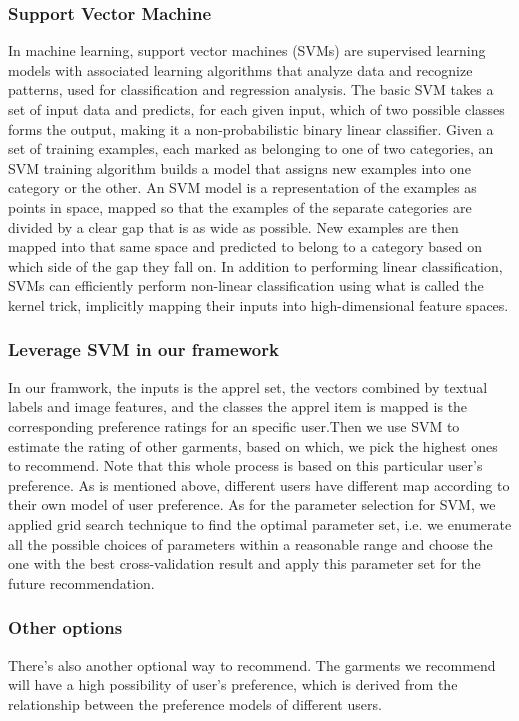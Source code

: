 \subsubsection{Support Vector Machine}
In machine learning, support vector machines (SVMs) are supervised learning models with associated learning algorithms that analyze data and recognize patterns, used for classification and regression analysis. The basic SVM takes a set of input data and predicts, for each given input, which of two possible classes forms the output, making it a non-probabilistic binary linear classifier. Given a set of training examples, each marked as belonging to one of two categories, an SVM training algorithm builds a model that assigns new examples into one category or the other. An SVM model is a representation of the examples as points in space, mapped so that the examples of the separate categories are divided by a clear gap that is as wide as possible. New examples are then mapped into that same space and predicted to belong to a category based on which side of the gap they fall on.
In addition to performing linear classification, SVMs can efficiently perform non-linear classification using what is called the kernel trick, implicitly mapping their inputs into high-dimensional feature spaces.

\subsubsection{Leverage SVM in our framework}
In our framwork, the inputs is the apprel set, the vectors combined by textual labels and image features, and the classes the apprel item is mapped is the corresponding preference ratings for an specific user.Then we use SVM to estimate the rating of other garments, based on which, we pick the highest ones to recommend. 
Note that this whole process is based on this particular user's preference. As is mentioned above, different users have different map according to their own model of user preference. 
As for the parameter selection for SVM, we applied grid search technique to find the optimal parameter set, i.e. we enumerate all the possible choices of parameters within a reasonable range and choose the one with the best cross-validation result and apply this parameter set for the future recommendation.

\subsubsection{Other options}
There's also another optional way to recommend. 
The garments we recommend will have a high possibility of user's preference, 
  which is derived from the relationship between the preference models of different users.


